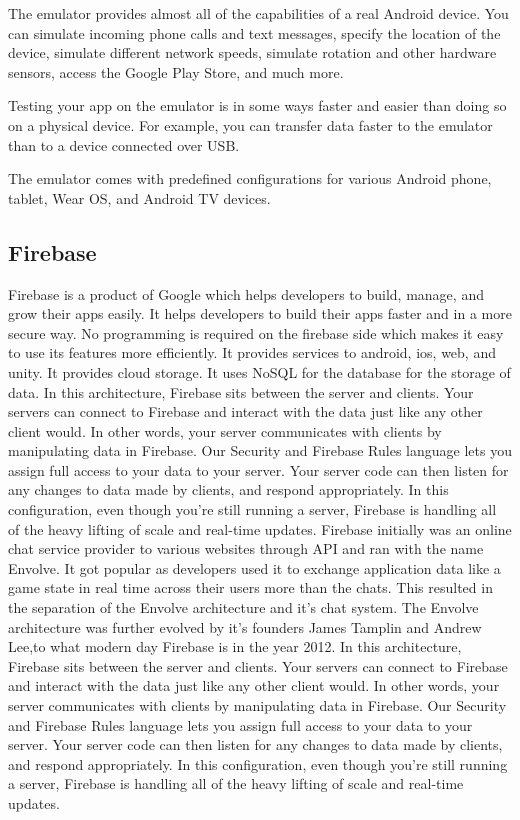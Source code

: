 The emulator provides almost all of the capabilities of a real Android device. You can simulate incoming phone calls and text messages, specify the location of the device, simulate different network speeds, simulate rotation and other hardware sensors, access the Google Play Store, and much more.

Testing your app on the emulator is in some ways faster and
easier than doing so on a physical device. For example, you can transfer data faster to the emulator than to a device connected over USB.

The emulator comes with predefined configurations for various Android phone, tablet, Wear OS, and Android TV devices.


\subsection{Firebase}

Firebase is a product of Google which helps developers to build, manage, and grow their apps easily. It helps developers to build their apps faster and in a more secure way. No programming is required on the firebase side which makes it easy to use its features more efficiently. It provides services to android, ios, web, and unity. It provides cloud storage. It uses NoSQL for the database for the storage of data.
In this architecture, Firebase sits between the server and clients. Your servers can connect to Firebase and interact with the data just like any other client would. In other words, your server communicates with clients by manipulating data in Firebase. Our Security and Firebase Rules language lets you assign full access to your data to your server. Your server code can then listen for any changes to data made by clients, and respond appropriately.
 In this configuration, even though you’re still running a server, Firebase is handling all of the heavy lifting of scale and real-time updates.
 Firebase initially was an online chat service provider to various websites through API and ran
with the name Envolve. It got popular as developers used it to exchange application data like a game
state in real time across their users more than the chats. This resulted in the separation of the Envolve
architecture and it’s chat system. The Envolve architecture was further evolved by it’s founders James
Tamplin and Andrew Lee,to what modern day Firebase is in the year 2012.
In this architecture, Firebase sits between the server and clients. Your servers can connect to
Firebase and interact with the data just like any other client would. In other words, your server
communicates with clients by manipulating data in Firebase. Our Security and Firebase Rules
language lets you assign full access to your data to your server. Your server code can then listen
for any changes to data made by clients, and respond appropriately. In this configuration, even though
you’re still running a server, Firebase is handling all of the heavy lifting of scale and real-time updates.
